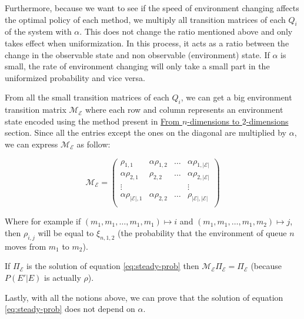 \documentclass[
  a4paper, xcolor = usenames,dvipsnames]{article}
\theoremstyle{definition}
\theoremstyle{definition}
\theoremstyle{definition}
\theoremstyle{definition}
\theoremstyle{remark}
\begin{document}
Furthermore, because we want to see if the speed of environment changing affects the optimal policy of each method, we multiply all transition matrices of each \(Q_{i}\) of the system with \(\alpha\). This does not change the ratio mentioned above and only takes effect when uniformization. In this process, it acts as a ratio between the change in the observable state and non observable (environment) state. If \(\alpha\) is small, the rate of environment changing will only take a small part in the uniformized probability and vice versa.

From all the small transition matrices of each \(Q_{i}\), we can get a big environment transition matrix \(\mathcal{M}_{\mathcal{E}}\) where each row and column represents an environment state encoded using the method present in \protect\hyperlink{from-n-dimensions-to-2-dimensions}{From \(n\)-dimensions to \(2\)-dimensions} section. Since all the entries except the ones on the diagonal are multiplied by \(\alpha\), we can express \(\mathcal{M}_{\mathcal{E}}\) as follow:

\[
\mathcal{M}_{\mathcal{E}} = \begin{pmatrix}
\rho_{1, 1} & \alpha \rho_{1, 2} & \dots & \alpha \rho_{1, |\mathcal{E}|} \\
\alpha \rho_{2, 1} & \rho_{2, 2} & \dots & \alpha \rho_{2, |\mathcal{E}|} \\
\vdots & & & \vdots \\
\alpha \rho_{|\mathcal{E}|, 1} & \alpha \rho_{2, 2} & \dots & \rho_{|\mathcal{E}|, |\mathcal{E}|} \\
\end{pmatrix}
\]

Where for example if \((m_{1}, m_{1}, \dots, m_{1}, m_{1}) \mapsto i\) and \((m_{1}, m_{1}, \dots, m_{1}, m_{2}) \mapsto j\), then \(\rho_{i, j}\) will be equal to \(\xi_{n, 1, 2}\) (the probability that the environment of queue \(n\) moves from \(m_{1}\) to \(m_{2}\)).

If \(\Pi_{\mathcal{E}}\) is the solution of equation \eqref{eq:steady-prob} then \(\mathcal{M}_{\mathcal{E}} \Pi_{\mathcal{E}} = \Pi_{\mathcal{E}}\) (because \(P(E' | E)\) is actually \(\rho\)).

Lastly, with all the notions above, we can prove that the solution of
equation \eqref{eq:steady-prob} does not depend on \(\alpha\).
\end{document}
